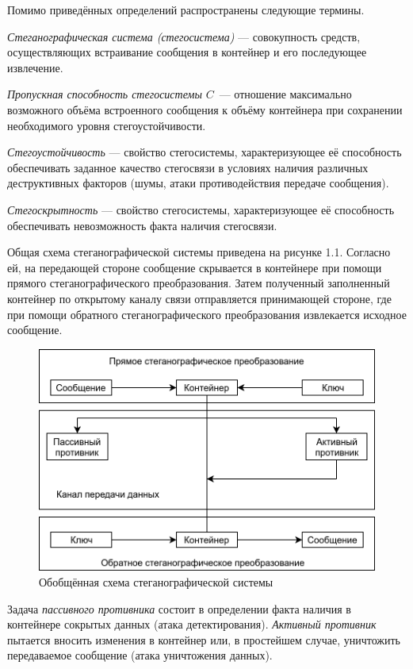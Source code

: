 Помимо приведённых определений распространены следующие термины.

\textit{Стеганографическая система (стегосистема)} --- совокупность средств, осуществляющих встраивание сообщения в контейнер и его последующее извлечение.

\textit{Пропускная способность стегосистемы} $ C $~--- отношение максимально возможного объёма встроенного сообщения к объёму контейнера при сохранении необходимого уровня стегоустойчивости.

\textit{Стегоустойчивость} --- свойство стегосистемы, характеризующее её способность обеспечивать заданное качество стегосвязи в условиях наличия различных деструктивных факторов (шумы, атаки противодействия передаче сообщения).

\textit{Стегоскрытность} --- свойство стегосистемы, характеризующее её способность обеспечивать невозможность факта наличия стегосвязи.

Общая схема стеганографической системы приведена на рисунке 1.1. Согласно ей, на передающей стороне сообщение скрывается в контейнере при помощи прямого стеганографического преобразования. Затем полученный заполненный контейнер по открытому каналу связи отправляется принимающей стороне, где при помощи обратного стеганографического преобразования извлекается исходное сообщение.

\begin{figure}
\centering
\includegraphics[width=1\textwidth]{include/graphics/stego_system_scheme}
\caption{Обобщённая схема стеганографической системы}
\label{fig:StegoSystem}
\end{figure}

Задача \textit{пассивного противника} состоит в определении факта наличия в контейнере сокрытых данных (атака детектирования). \textit{Активный противник} пытается вносить изменения в контейнер или, в простейшем случае, уничтожить передаваемое сообщение (атака уничтожения данных).

